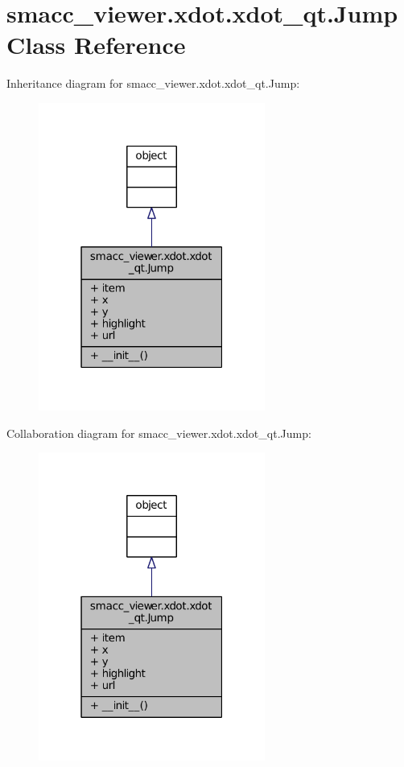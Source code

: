 \hypertarget{classsmacc__viewer_1_1xdot_1_1xdot__qt_1_1Jump}{}\section{smacc\+\_\+viewer.\+xdot.\+xdot\+\_\+qt.\+Jump Class Reference}
\label{classsmacc__viewer_1_1xdot_1_1xdot__qt_1_1Jump}


Inheritance diagram for smacc\+\_\+viewer.\+xdot.\+xdot\+\_\+qt.\+Jump\+:
\nopagebreak
\begin{figure}[H]
\begin{center}
\leavevmode
\includegraphics[width=211pt]{classsmacc__viewer_1_1xdot_1_1xdot__qt_1_1Jump__inherit__graph}
\end{center}
\end{figure}


Collaboration diagram for smacc\+\_\+viewer.\+xdot.\+xdot\+\_\+qt.\+Jump\+:
\nopagebreak
\begin{figure}[H]
\begin{center}
\leavevmode
\includegraphics[width=211pt]{classsmacc__viewer_1_1xdot_1_1xdot__qt_1_1Jump__coll__graph}
\end{center}
\end{figure}
